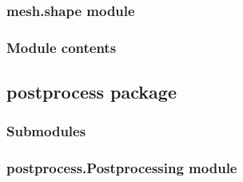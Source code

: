 \documentclass[letterpaper,10pt,english]{sphinxmanual}
\begin{document}
\subsubsection{mesh.shape module}
\label{\detokenize{mesh:mesh-shape-module}}

\subsubsection{Module contents}
\label{\detokenize{mesh:module-mesh}}\label{\detokenize{mesh:module-contents}}

\subsection{postprocess package}
\label{\detokenize{postprocess:postprocess-package}}\label{\detokenize{postprocess::doc}}

\subsubsection{Submodules}
\label{\detokenize{postprocess:submodules}}

\subsubsection{postprocess.Postprocessing module}
\label{\detokenize{postprocess:module-postprocess.Postprocessing}}\label{\detokenize{postprocess:postprocess-postprocessing-module}}
\end{document}
